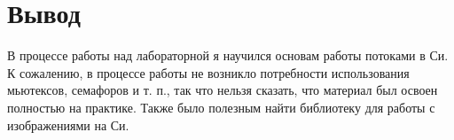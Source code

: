 \section{Вывод}

В процессе работы над лабораторной я научился основам работы потоками в Си. К сожалению, в процессе работы не возникло потребности использования мьютексов, семафоров и т. п., так что нельзя сказать, что материал был освоен полностью на практике. Также было полезным найти библиотеку для работы с изображениями на Си.

